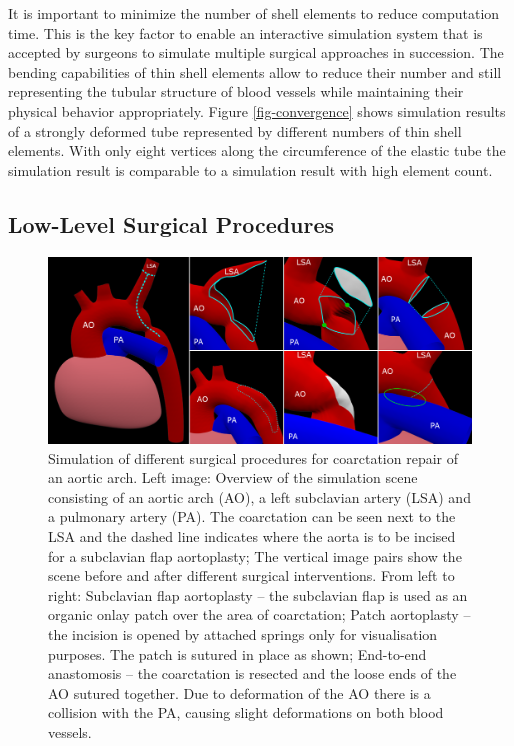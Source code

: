 It is important to minimize the number of shell elements to reduce computation time. This is the key factor to enable an interactive simulation system that is accepted by surgeons to simulate multiple surgical approaches in succession. The bending capabilities of thin shell elements allow to reduce their number and still representing the tubular structure of blood vessels while maintaining their physical behavior appropriately. Figure \ref{fig-convergence} shows simulation results of a strongly deformed tube represented by different numbers of thin shell elements. With only eight vertices along the circumference of the elastic tube the simulation result is comparable to a simulation result with high element count.

\subsection{Low-Level Surgical Procedures}

\begin{figure}[tbh]
  \centering
  \includegraphics[width=\columnwidth]{img/surgery.png}
  \caption{Simulation of different surgical procedures for coarctation repair of an aortic arch. Left image: Overview of the simulation scene consisting of an aortic arch (AO), a left subclavian artery (LSA) and a pulmonary artery (PA). The coarctation can be seen next to the LSA and the dashed line indicates where the aorta is to be incised for a subclavian flap aortoplasty; The vertical image pairs show the scene before and after different surgical interventions. From left to right: Subclavian flap aortoplasty -- the subclavian flap is used as an organic onlay patch over the area of coarctation; Patch aortoplasty -- the incision is opened by attached springs only for visualisation purposes. The patch is sutured in place as shown; End-to-end anastomosis -- the coarctation is resected and the loose ends of the AO sutured together. Due to deformation of the AO there is a collision with the PA, causing slight deformations on both blood vessels. }
  \label{fig-surgery}
\end{figure}

